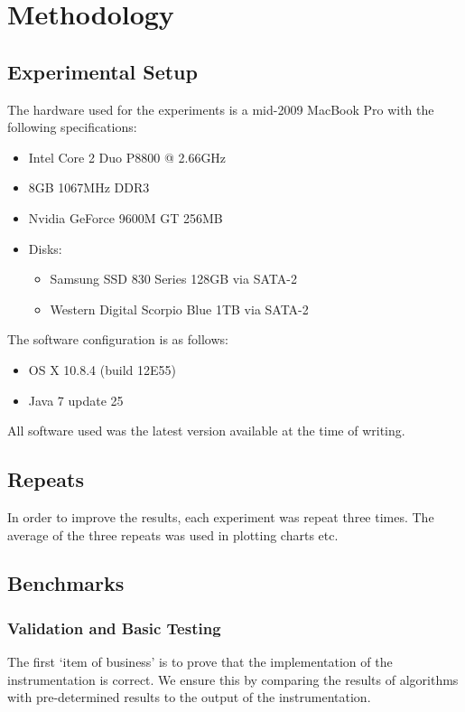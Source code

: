 \chapter{Methodology} \label{chp:methodology}
\section{Experimental Setup} \label{sec:methodology/setup}
The hardware used for the experiments is a mid-2009 MacBook Pro with the following specifications:
	
\begin{itemize}
	\item Intel Core 2 Duo P8800 @ 2.66GHz
	\item 8GB 1067MHz DDR3
	\item Nvidia GeForce 9600M GT 256MB
	\item Disks:
	\begin{itemize}
		\item Samsung SSD 830 Series 128GB via SATA-2
		\item Western Digital Scorpio Blue 1TB via SATA-2
	\end{itemize}
\end{itemize}

The software configuration is as follows:
\begin{itemize}
	\item OS X 10.8.4 (build 12E55)
	\item Java 7 update 25
\end{itemize}

All software used was the latest version available at the time of writing.

\section{Repeats} \label{sec:methodology/repeats}
In order to improve the results, each experiment was repeat three times. The average of the three repeats was used in plotting charts etc.

\section{Benchmarks} \label{sec:methodology/benchmarks}
	\subsection{Validation and Basic Testing} \label{sec:methodology/benchmarks/simple}
	The first `item of business' is to prove that the implementation of the instrumentation is correct. We ensure this by comparing the results of algorithms with pre-determined results to the output of the instrumentation.
	
